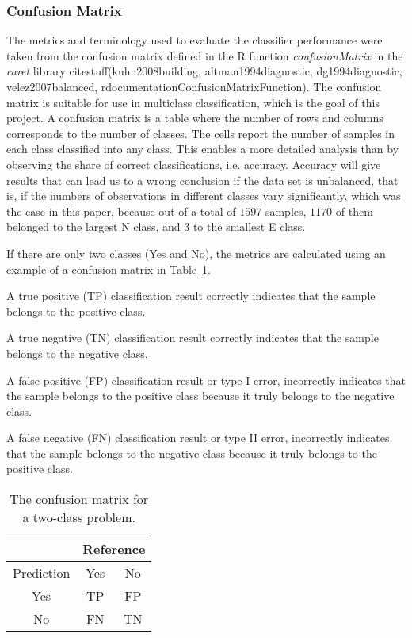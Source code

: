 \documentclass[preprint,12pt]{elsarticle}
\begin{document}
\subsubsection{Confusion Matrix}

The metrics and terminology used to evaluate the classifier performance were taken from the confusion matrix defined in the R function \textit{confusionMatrix} in the \textit{caret} library citestuff(kuhn2008building, altman1994diagnostic, dg1994diagnostic, velez2007balanced, rdocumentationConfusionMatrixFunction). The confusion matrix is suitable for use in multiclass classification, which is the goal of this project. A confusion matrix is a table where the number of rows and columns corresponds to the number of classes. The cells report the number of samples in each class classified into any class. This enables a more detailed analysis than by observing the share of correct classifications, i.e. accuracy. Accuracy will give results that can lead us to a wrong conclusion if the data set is unbalanced, that is, if the numbers of observations in different classes vary significantly, which was the case in this paper, because out of a total of $1597$ samples, $1170$ of them belonged to the largest N class, and $3$ to the smallest E class.

If there are only two classes (Yes and No), the metrics are calculated using an example of a confusion matrix in Table~\ref{tab:cm}.

A true positive (TP) classification result correctly indicates that the sample belongs to the positive class.

A true negative (TN) classification result correctly indicates that the sample belongs to the negative class.
 
A false positive (FP) classification result or type I error, incorrectly indicates that the sample belongs to the positive class because it truly belongs to the negative class.

A false negative (FN) classification result or type II error, incorrectly indicates that the sample belongs to the negative class because it truly belongs to the positive class.

\begin{table}[!ht]
	\centering
	\begin{tabular}{|c|c|c|}
		\hline
		 & \multicolumn{2}{|c|}{Reference} \\ \hline
        Prediction & Yes & No \\ \hline
        Yes & TP & FP \\ \hline
        No & FN & TN \\ \hline
	\end{tabular}
	\caption{The confusion matrix for a two-class problem.}
	\label{tab:cm}
\end{table}
\end{document}
